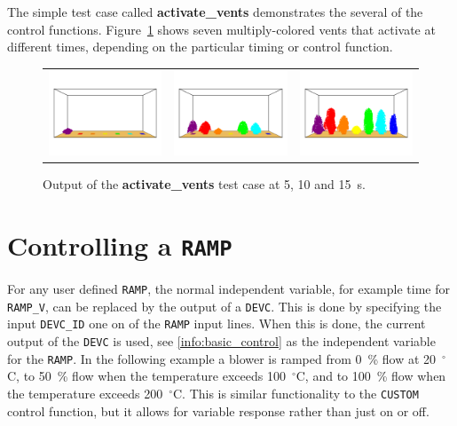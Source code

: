 \documentclass[11pt]{book}
\newcommand{\ct}{\tt\small}
\begin{document}
The simple test case called {\bf activate\_vents} demonstrates the several of the control functions. Figure~\ref{activate_vents} shows seven
multiply-colored vents that activate at different times, depending on the particular timing or control function.
\begin{figure}[ht]
\begin{tabular*}{\textwidth}{lll}
\includegraphics[width=2.05in]{SCRIPT_FIGURES/activate_vents_5} &
\includegraphics[width=2.05in]{SCRIPT_FIGURES/activate_vents_10} &
\includegraphics[width=2.05in]{SCRIPT_FIGURES/activate_vents_15}
\end{tabular*}
\caption[Example of a vent controls.]{Output of the {\bf activate\_vents} test case at 5, 10 and 15~s.}
\label{activate_vents}
\end{figure}




\section{Controlling a \texorpdfstring{{\tt RAMP}}{RAMP}}
\label{info:RAMPDEVC}

For any user defined {\ct RAMP}, the normal independent variable, for example time for {\ct RAMP\_V}, can be replaced by the output of a {\ct DEVC}.
This is done by specifying the input {\ct DEVC\_ID} one on of the {\ct RAMP} input lines.  When this is done, the current output of the {\ct DEVC} is used, see \ref{info:basic_control} as the independent variable for the {\ct RAMP}.
In the following example a blower is ramped from 0~\% flow at 20~$^\circ$C, to 50~\% flow when the temperature exceeds 100~$^\circ$C, and to 100~\% flow when the temperature exceeds 200~$^\circ$C.
This is similar functionality to the {\ct CUSTOM} control function, but it allows for variable response rather than just on or off.
\end{document}
